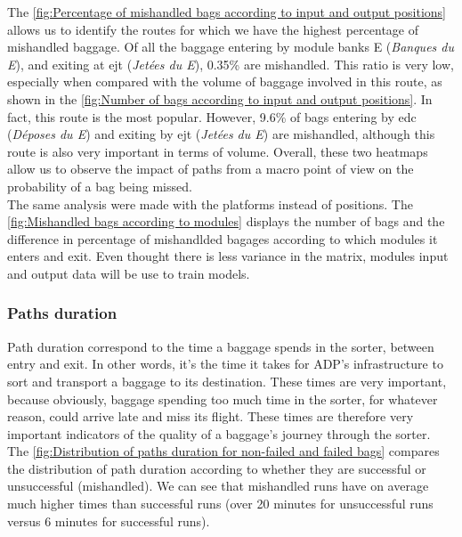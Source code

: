 \documentclass[12pt]{article}
\begin{document}
\indent The \autoref{fig:Percentage of mishandled bags according to input and output positions} allows us to identify the routes for which we have the highest percentage of mishandled baggage. 
Of all the baggage entering by module banks E (\textit{Banques du E}), and exiting at \acrshort{ejt} (\textit{Jetées du E}), 0.35\% are mishandled. This ratio is very low, especially when compared with the volume of baggage involved in this route, as shown in the \autoref{fig:Number of bags according to input and output positions}. In fact, this route is the most popular. 
However, 9.6\% of bags entering by \acrshort{edc} (\textit{Déposes du E}) and exiting by \acrshort{ejt} (\textit{Jetées du E}) are mishandled, although this route is also very important in terms of volume. Overall, these two heatmaps allow us to observe the impact of paths from a macro point of view on the probability of a bag being missed.\\
\indent The same analysis were made with the platforms instead of positions. The \autoref{fig:Mishandled bags according to modules} displays the number of bags and the difference in percentage of mishandlded bagages according to which modules it enters and exit. Even thought there is less variance in the matrix, modules input and output data will be use to train models.


\subsubsection{Paths duration}\label{subsubsec:Paths duration}

Path duration correspond to the time a baggage spends in the sorter, between entry and exit. In other words, it's the time it takes for ADP's infrastructure to sort and transport a baggage to its destination. These times are very important, because obviously, baggage spending too much time in the sorter, for whatever reason, could arrive late and miss its flight. These times are therefore very important indicators of the quality of a baggage's journey through the sorter. 
The \autoref{fig:Distribution of paths duration for non-failed and failed bags} compares the distribution of path duration according to whether they are successful or unsuccessful (mishandled). We can see that mishandled runs have on average much higher times than successful runs (over 20 minutes for unsuccessful runs versus 6 minutes for successful runs).
\end{document}
